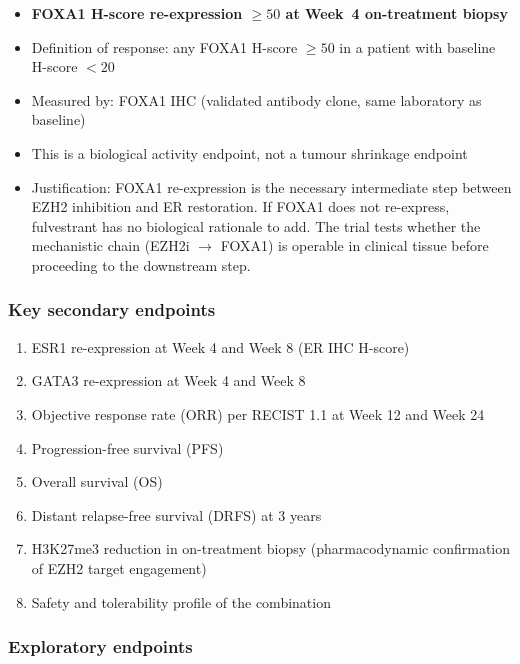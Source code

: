 \documentclass[12pt, a4paper]{article}
\begin{document}
\begin{itemize}
  \item \textbf{FOXA1 H-score re-expression $\geq 50$
        at Week~4 on-treatment biopsy}
  \item Definition of response: any FOXA1 H-score
        $\geq 50$ in a patient with baseline H-score
        $< 20$
  \item Measured by: FOXA1 IHC (validated antibody
        clone, same laboratory as baseline)
  \item This is a biological activity endpoint, not
        a tumour shrinkage endpoint
  \item Justification: FOXA1 re-expression is the
        necessary intermediate step between EZH2
        inhibition and ER restoration. If FOXA1
        does not re-express, fulvestrant has no
        biological rationale to add. The trial
        tests whether the mechanistic chain
        (EZH2i $\rightarrow$ FOXA1) is operable
        in clinical tissue before proceeding to
        the downstream step.
\end{itemize}

\subsubsection{Key secondary endpoints}

\begin{enumerate}
  \item ESR1 re-expression at Week 4 and Week 8
        (ER IHC H-score)
  \item GATA3 re-expression at Week 4 and Week 8
  \item Objective response rate (ORR) per RECIST 1.1
        at Week 12 and Week 24
  \item Progression-free survival (PFS)
  \item Overall survival (OS)
  \item Distant relapse-free survival (DRFS)
        at 3 years
  \item H3K27me3 reduction in on-treatment biopsy
        (pharmacodynamic confirmation of EZH2 target
        engagement)
  \item Safety and tolerability profile of the
        combination
\end{enumerate}

\subsubsection{Exploratory endpoints}
\end{document}
